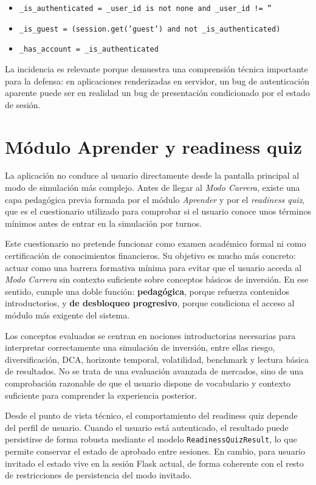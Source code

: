 \begin{itemize}
    \item \texttt{\_is\_authenticated = \_user\_id is not none and \_user\_id != ''}
    \item \texttt{\_is\_guest = (session.get('guest') and not \_is\_authenticated)}
    \item \texttt{\_has\_account = \_is\_authenticated}
\end{itemize}

La incidencia es relevante porque demuestra una comprensión técnica importante para la defensa: en aplicaciones renderizadas en servidor, un bug de autenticación aparente puede ser en realidad un bug de presentación condicionado por el estado de sesión.

\section{Módulo Aprender y readiness quiz}

La aplicación no conduce al usuario directamente desde la pantalla principal al modo de simulación más complejo. Antes de llegar al \textit{Modo Carrera}, existe una capa pedagógica previa formada por el módulo \textit{Aprender} y por el \textit{readiness quiz}, que es el cuestionario utilizado para comprobar si el usuario conoce unos términos mínimos antes de entrar en la simulación por turnos.

Este cuestionario no pretende funcionar como examen académico formal ni como certificación de conocimientos financieros. Su objetivo es mucho más concreto: actuar como una barrera formativa mínima para evitar que el usuario acceda al \textit{Modo Carrera} sin contexto suficiente sobre conceptos básicos de inversión. En ese sentido, cumple una doble función: \textbf{pedagógica}, porque refuerza contenidos introductorios, y \textbf{de desbloqueo progresivo}, porque condiciona el acceso al módulo más exigente del sistema.

Los conceptos evaluados se centran en nociones introductorias necesarias para interpretar correctamente una simulación de inversión, entre ellas riesgo, diversificación, DCA, horizonte temporal, volatilidad, benchmark y lectura básica de resultados. No se trata de una evaluación avanzada de mercados, sino de una comprobación razonable de que el usuario dispone de vocabulario y contexto suficiente para comprender la experiencia posterior.

Desde el punto de vista técnico, el comportamiento del readiness quiz depende del perfil de usuario. Cuando el usuario está autenticado, el resultado puede persistirse de forma robusta mediante el modelo \texttt{ReadinessQuizResult}, lo que permite conservar el estado de aprobado entre sesiones. En cambio, para usuario invitado el estado vive en la sesión Flask actual, de forma coherente con el resto de restricciones de persistencia del modo invitado.

